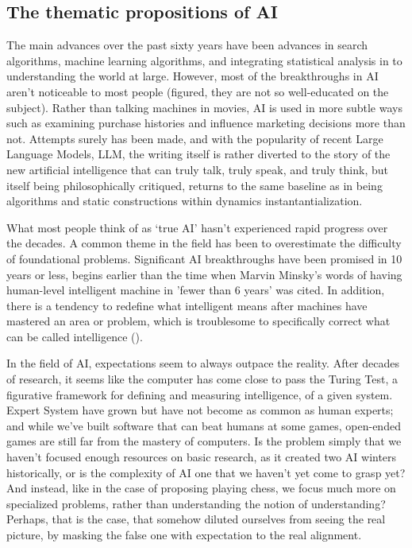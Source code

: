 \subsection{The thematic propositions of AI}
The main advances over the past sixty years have been advances in search algorithms, machine learning algorithms, and integrating statistical analysis in to understanding the world at large. However, most of the breakthroughs in AI aren't noticeable to most people (figured, they are not so well-educated on the subject). Rather than talking machines in movies, AI is used in more subtle ways such as examining purchase histories and influence marketing decisions more than not. Attempts surely has been made, and with the popularity of recent Large Language Models, LLM, the writing itself is rather diverted to the story of the new artificial intelligence that can truly talk, truly speak, and truly think, but itself being philosophically critiqued, returns to the same baseline as in being algorithms and static constructions within dynamics instantantialization. 

What most people think of as `true AI' hasn't experienced rapid progress over the decades. A common theme in the field has been to overestimate the difficulty of foundational problems. Significant AI breakthroughs have been promised in 10 years or less, begins earlier than the time when Marvin Minsky's words of having human-level intelligent machine in 'fewer than 6 years' was cited. In addition, there is a tendency to redefine what intelligent means after machines have mastered an area or problem, which is troublesome to specifically correct what can be called intelligence (\cite{10.5555/1671238}). 

In the field of AI, expectations seem to always outpace the reality. After decades of research, it seems like the computer has come close to pass the Turing Test, a figurative framework for defining and measuring intelligence, of a given system. Expert System have grown but have not become as common as human experts; and while we've built software that can beat humans at some games, open-ended games are still far from the mastery of computers. Is the problem simply that we haven't focused enough resources on basic research, as it created two AI winters historically, or is the complexity of AI one that we haven't yet come to grasp yet? And instead, like in the case of proposing playing chess, we focus much more on specialized problems, rather than understanding the notion of understanding? Perhaps, that is the case, that somehow diluted ourselves from seeing the real picture, by masking the false one with expectation to the real alignment. 

